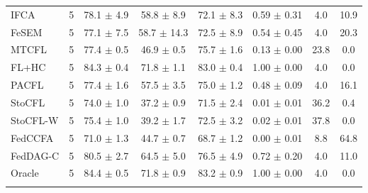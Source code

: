 {{\begin{tabular}{l r c c c c c c}
IFCA & 5 & 78.1 $\pm$ 4.9 & 58.8 $\pm$ 8.9 & 72.1 $\pm$ 8.3 & 0.59 $\pm$ 0.31 & 4.0 & 10.9 \\
FeSEM & 5 & 77.1 $\pm$ 7.5 & 58.7 $\pm$ 14.3 & 72.5 $\pm$ 8.9 & 0.54 $\pm$ 0.45 & 4.0 & 20.3 \\
MTCFL & 5 & 77.4 $\pm$ 0.5 & 46.9 $\pm$ 0.5 & 75.7 $\pm$ 1.6 & 0.13 $\pm$ 0.00 & 23.8 & 0.0 \\
FL+HC & 5 & 84.3 $\pm$ 0.4 & 71.8 $\pm$ 1.1 & 83.0 $\pm$ 0.4 & 1.00 $\pm$ 0.00 & 4.0 & 0.0 \\
PACFL & 5 & 77.4 $\pm$ 1.6 & 57.5 $\pm$ 3.5 & 75.0 $\pm$ 1.2 & 0.48 $\pm$ 0.09 & 4.0 & 16.1 \\
StoCFL & 5 & 74.0 $\pm$ 1.0 & 37.2 $\pm$ 0.9 & 71.5 $\pm$ 2.4 & 0.01 $\pm$ 0.01 & 36.2 & 0.4 \\
StoCFL-W & 5 & 75.4 $\pm$ 1.0 & 39.2 $\pm$ 1.7 & 72.5 $\pm$ 3.2 & 0.02 $\pm$ 0.01 & 37.8 & 0.0 \\
FedCCFA & 5 & 71.0 $\pm$ 1.3 & 44.7 $\pm$ 0.7 & 68.7 $\pm$ 1.2 & 0.00 $\pm$ 0.01 & 8.8 & 64.8 \\
FedDAG-C & 5 & 80.5 $\pm$ 2.7 & 64.5 $\pm$ 5.0 & 76.5 $\pm$ 4.9 & 0.72 $\pm$ 0.20 & 4.0 & 11.0 \\
Oracle & 5 & 84.4 $\pm$ 0.5 & 71.8 $\pm$ 0.9 & 83.2 $\pm$ 0.9 & 1.00 $\pm$ 0.00 & 4.0 & 0.0 \\
\addlinespace
\bottomrule
\end{tabular}}
}

